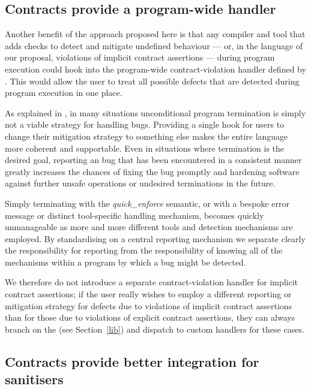\subsection{Contracts provide a program-wide handler}
\label{handler}

Another benefit of the approach proposed here is that any compiler and tool that adds checks to detect and mitigate undefined behaviour --- or, in the language of our proposal, violations of implicit contract assertions --- during program execution could hook into the program-wide contract-violation handler defined by \cite{P2900R9}. This would allow the user to treat all possible defects that are detected during program execution in one place. 

As explained in \cite{P2698R0}, in many situations unconditional program termination is simply not a viable strategy for handling bugs.  Providing a single hook for users to change their mitigation strategy to something else makes the entire language more coherent and supportable. Even in situations where termination is the desired goal, reporting an bug that has been encountered in a consistent manner greatly increases the chances of fixing the bug promptly and hardening software against further unsafe operations or undesired terminations in the future.

Simply terminating with the \emph{quick_enforce} semantic, or with a bespoke error message or distinct tool-specific handling mechanism, becomes quickly unmanageable as more and more different tools and detection mechanisms are employed. By standardising on a central reporting mechanism we separate clearly the responsibility for reporting from the responsibility of knowing all of the mechanisms within a program by which a bug might be detected.

We therefore do not introduce a separate contract-violation handler for implicit contract assertions; if the user really wishes to employ a different reporting or mitigation strategy for defects due to violations of implicit contract assertions than for those due to violations of explicit contract assertions, they can always branch on the  (see Section~\ref{lib}) and dispatch to custom handlers for these cases.

\subsection{Contracts provide better integration for sanitisers}
\label{sanitisers}

